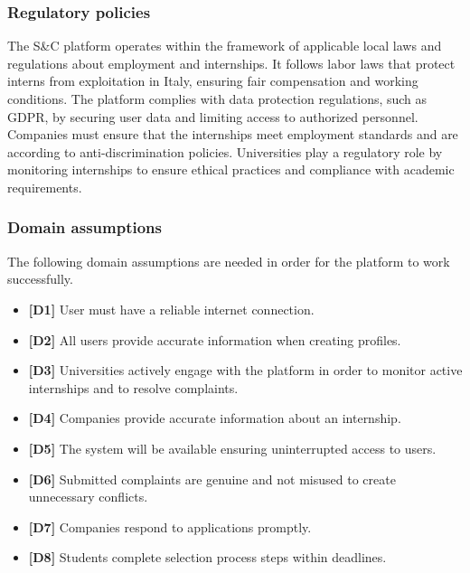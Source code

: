 \subsubsection{Regulatory policies}

The S\&C platform operates within the framework of applicable local laws and regulations about employment and internships. It follows labor laws that protect interns from exploitation in Italy, ensuring fair compensation and working conditions. The platform complies with data protection regulations, such as GDPR, by securing user data and limiting access to authorized personnel. Companies must ensure that the internships meet employment standards and are according to anti-discrimination policies. Universities play a regulatory role by monitoring internships to ensure ethical practices and compliance with academic requirements.

\subsubsection{Domain assumptions}

The following domain assumptions are needed in order for the platform to work successfully. 

\begin{itemize}
    \item \textbf{[D1]} User must have a reliable internet connection.
    \item \textbf{[D2]} All users provide accurate information when creating profiles.
    \item \textbf{[D3]} Universities actively engage with the platform in order to monitor active internships and to resolve complaints.
    \item \textbf{[D4]} Companies provide accurate information about an internship.
    \item \textbf{[D5]} The system will be available ensuring uninterrupted access to users.
    \item \textbf{[D6]} Submitted complaints are genuine and not misused to create unnecessary conflicts.
    \item \textbf{[D7]} Companies respond to applications promptly.
    \item \textbf{[D8]} Students complete selection process steps within deadlines.
\end{itemize}